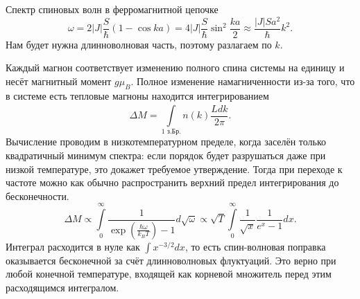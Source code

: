 \documentclass[a4paper]{article}
\begin{document}
\begin{sol}
Спектр спиновых волн в ферромагнитной цепочке
\[
	\omega= 2|J| \frac{S}{\hbar } (1-\cos ka)
	=4|J| \frac{S}{\hbar } \sin ^2 \frac{ka}{2}
	\approx
	\frac{|J| S a^2}{\hbar }k^2
.\] 
Нам будет нужна длинноволновая часть, поэтому
разлагаем по $k$.

Каждый магнон соответствует изменению полного спина
системы на единицу и несёт магнитный  момент 
$g\mu_B$. Полное изменение намагниченности
из-за того, что в системе есть тепловые магноны
находится интегрированием
\[
	\Delta M= \int\limits_{1\text{ з.Бр.}}^{} 
	n(k) \frac{Ldk}{2\pi}
.\] 
Вычисление проводим в низкотемпературном
пределе, когда заселён только квадратичный
минимум спектра: если порядок будет разрушаться
даже при низкой температуре, это докажет требуемое
утверждение. Тогда при переходе к частоте
можно как обычно распространить верхний предел
интегрирования до бесконечности.
\[
\Delta M\propto \int\limits_{0}^{\infty} 
\frac{1}{\exp \left( \frac{\hbar \omega}{k_B T} \right) -1}d \sqrt{\omega} \propto
\sqrt{T} \int\limits_{0 }^{\infty} 
\frac{1}{\sqrt{x} }\frac{1}{e^x-1}dx
.\] 
Интеграл расходится в нуле как $\int x^{-3 /2}dx$,
то есть спин-волновая поправка оказывается
бесконечной за счёт длинноволновых флуктуаций.
Это верно при любой конечной температуре, входящей
как корневой множитель перед этим  расходящимся
интегралом.
\end{sol}
\end{document}
